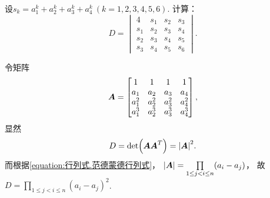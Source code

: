 \begin{example}
设\(s_k = a_1^k + a_2^k + a_3^k + a_4^k\ (k=1,2,3,4,5,6)\).
计算：\[
	D = \begin{vmatrix}
		4 & s_1 & s_2 & s_3 \\
		s_1 & s_2 & s_3 & s_4 \\
		s_2 & s_3 & s_4 & s_5 \\
		s_3 & s_4 & s_5 & s_6
	\end{vmatrix}.
\]
\begin{solution}
令矩阵\[
	\boldsymbol{A} = \begin{bmatrix}
		1 & 1 & 1 & 1 \\
		a_1 & a_2 & a_3 & a_4 \\
		a_1^2 & a_2^2 & a_3^2 & a_4^2 \\
		a_1^3 & a_2^3 & a_3^3 & a_4^3
	\end{bmatrix},
\]
显然\[
	D = \det(\boldsymbol{A}\boldsymbol{A}^T) = \abs{\boldsymbol{A}}^2.
\]
而根据\cref{equation:行列式.范德蒙德行列式}，
\(\abs{\boldsymbol{A}}
= \prod\limits_{1 \leq j < i \leq n} (a_i - a_j)\)，
故\(D = \prod\limits_{1 \leq j < i \leq n} (a_i - a_j)^2\).
\end{solution}
\end{example}
